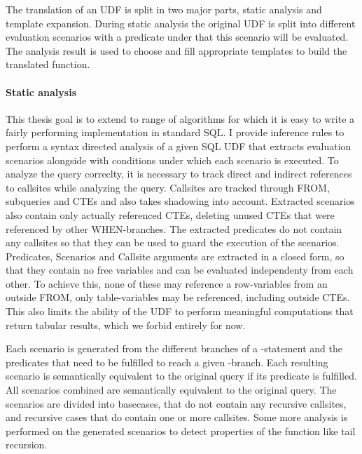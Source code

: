 The translation of an UDF is split in two major parts, static analysis and template expansion. During static analysis the original UDF is split into different evaluation scenarios with a predicate under that this scenario will be evaluated. The analysis result is used to choose and fill appropriate templates to build the translated function.

\paragraph*{Static analysis}
This thesis goal is to extend to range of algorithms for which it is easy to write a fairly performing implementation in standard SQL. I provide inference rules to perform a syntax directed analysis of a given SQL UDF that extracts evaluation scenarios alongside with conditions under which each scenario is executed. To analyze the query correclty, it is necessary to track direct and indirect references to callsites while analyzing the query. Callsites are tracked through FROM, subqueries and CTEs and also takes shadowing into account. Extracted scenarios also contain only actually referenced CTEs, deleting unused CTEs that were referenced by other WHEN-branches. The extracted predicates do not contain any callsites so that they can be used to guard the execution of the scenarios. Predicates, Scenarios and Callsite arguments are extracted in a closed form, so that they contain no free variables and can be evaluated independenty from each other. To achieve this, none of these may reference a row-variables from an outside FROM, only table-variables may be referenced, including outside CTEs. This also limits the ability of the UDF to perform meaningful computations that return tabular results, which we forbid entirely for now.

Each scenario is generated from the different branches of a \CASE-statement and the predicates that need to be fulfilled to reach a given \WHEN-branch. Each resulting scenario is semantically equivalent to the original query if its predicate is fulfilled. All scenarios combined are semantically equivalent to the original query. The scenarios are divided into basecases, that do not contain any recursive callsites, and recursive cases that do contain one or more callsites. Some more analysis is performed on the generated scenarios to detect properties of the function like tail recursion.



